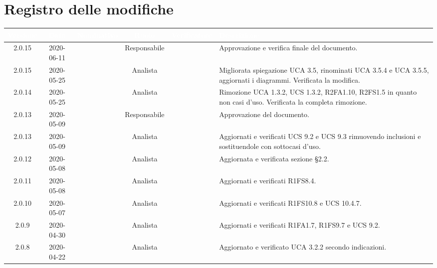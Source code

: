 \section*{Registro delle modifiche}
\setcounter{table}{-1}
{

\renewcommand{\arraystretch}{1.5}
\centering
\begin{longtable}{ c c  C{2.3cm} c C{3cm} C{3.2cm}}
\textcolor{white}{\textbf{Versione}} &
\textcolor{white}{\textbf{Data}}&
\textcolor{white}{\textbf{Nominativo}}&
\textcolor{white}{\textbf{Ruolo}}&
\textcolor{white}{\textbf{Verificatore}}&
\textcolor{white}{\textbf{Descrizione}}\\
\endhead

2.0.15 & 2020-06-11 & \CE{} & Responsabile & \MC{} & Approvazione e verifica finale del documento. \\

2.0.15 & 2020-05-25 & \AT{} & Analista & \DF{} & Migliorata spiegazione UCA 3.5, rinominati UCA 3.5.4 e UCA 3.5.5, aggiornati i diagrammi. Verificata la modifica. \\

2.0.14 & 2020-05-25 & \DF{} & Analista & \PF{} & Rimozione UCA 1.3.2, UCS 1.3.2, R2FA1.10, R2FS1.5 in quanto non casi d'uso. Verificata la completa rimozione. \\

2.0.13 & 2020-05-09 & \BR{} & Responsabile & \PF{} & Approvazione del documento. \\

2.0.13 & 2020-05-09 & \DF{} & Analista & \PF{} & Aggiornati e verificati UCS 9.2 e UCS 9.3 rimuovendo inclusioni e sostituendole con sottocasi d'uso.\\

2.0.12 & 2020-05-08 & \DF{} & Analista & \CE{} & Aggiornata e verificata sezione §2.2.\\

2.0.11 & 2020-05-08 & \AT{} & Analista & \CE{} & Aggiornati e verificati R1FS8.4. \\

2.0.10 & 2020-05-07 & \DF{} & Analista & \CE{} & Aggiornati e verificati R1FS10.8 e UCS 10.4.7. \\

2.0.9 & 2020-04-30 & \DF{} & Analista & \PF{} & Aggiornati e verificati R1FA1.7, R1FS9.7 e UCS 9.2. \\

2.0.8 & 2020-04-22 & \AT{} & Analista & \PF{} & Aggiornato e verificato UCA 3.2.2 secondo indicazioni. \\


\end{longtable}}

